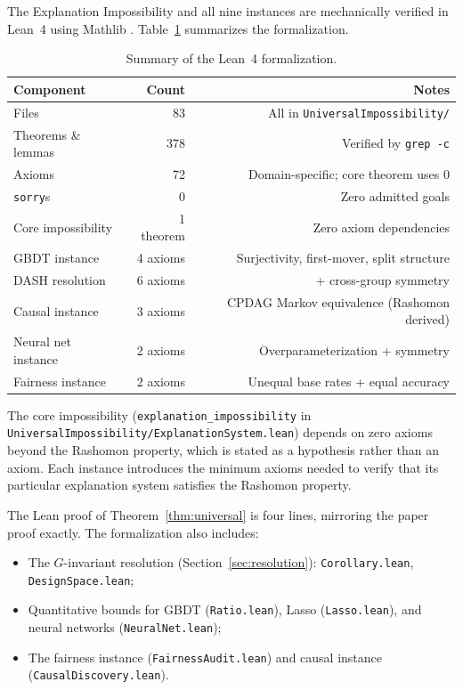 \documentclass{article}
\begin{document}
The Explanation Impossibility and all nine instances are mechanically
verified in Lean~4 \citep{demoura2021lean4} using Mathlib
\citep{mathlib2020}.  Table~\ref{tab:lean-summary} summarizes the
formalization.

\begin{table}[h]
\centering
\caption{Summary of the Lean~4 formalization.}
\label{tab:lean-summary}
\begin{tabular}{lrr}
\toprule
Component & Count & Notes \\
\midrule
Files & 83 & All in \texttt{UniversalImpossibility/} \\
Theorems \& lemmas & 378 & Verified by \texttt{grep -c} \\
Axioms & 72 & Domain-specific; core theorem uses 0 \\
\texttt{sorry}s & 0 & Zero admitted goals \\
\midrule
Core impossibility & 1 theorem & Zero axiom dependencies \\
GBDT instance & 4 axioms & Surjectivity, first-mover, split structure \\
DASH resolution & 6 axioms & + cross-group symmetry \\
Causal instance & 3 axioms & CPDAG Markov equivalence (Rashomon derived) \\
Neural net instance & 2 axioms & Overparameterization + symmetry \\
Fairness instance & 2 axioms & Unequal base rates + equal accuracy \\
\bottomrule
\end{tabular}
\end{table}

The core impossibility (\texttt{explanation\_impossibility} in
\texttt{UniversalImpossibility/ExplanationSystem.lean}) depends on zero axioms beyond
the Rashomon property, which is stated as a hypothesis rather than an axiom.
Each instance introduces the minimum axioms needed to verify that its
particular explanation system satisfies the Rashomon property.

The Lean proof of Theorem~\ref{thm:universal} is four lines, mirroring the
paper proof exactly.  The formalization also includes:
\begin{itemize}
  \item The $G$-invariant resolution (Section~\ref{sec:resolution}):
    \texttt{Corollary.lean}, \texttt{DesignSpace.lean};
  \item Quantitative bounds for GBDT (\texttt{Ratio.lean}), Lasso
    (\texttt{Lasso.lean}), and neural networks (\texttt{NeuralNet.lean});
  \item The fairness instance (\texttt{FairnessAudit.lean}) and causal
    instance (\texttt{CausalDiscovery.lean}).
\end{itemize}
\end{document}
